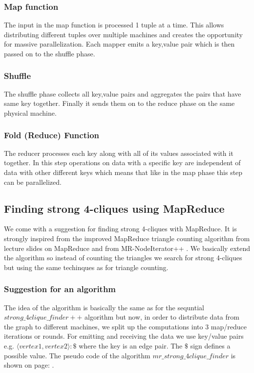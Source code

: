 \documentclass{article}
\begin{document}
\subsubsection{Map function}
The input in the map function is processed 1 tuple at a time. This allows distributing different tuples over multiple machines and creates the opportunity for massive parallelization. Each mapper emits a key,value pair which is then passed on to the shuffle phase.

\subsubsection{Shuffle}
The shuffle phase collects all key,value pairs and aggregates the pairs that have same key together. Finally it sends them on to the reduce phase on the same physical machine.

\subsubsection{Fold (Reduce) Function}
The reducer processes each key along with all of its values associated with it together. In this step operations on data with a specific key are independent of data with other different keys which means that like in the map phase this step can be parallelized.

\subsection{Finding strong 4-cliques using MapReduce}
We come with a suggestion for finding strong 4-cliques with MapReduce. It is strongly inspired from the improved MapReduce triangle counting algorithm from lecture slides on MapReduce \cite{lnMapReduce} and from MR-NodeIterator++ \cite{countingTriangles}. We basically extend the algorithm so instead of counting the triangles we search for strong 4-cliques but using the same techinques as for triangle counting.

\subsubsection{Suggestion for an algorithm}
The idea of the algorithm is basically the same as for the sequntial $strong\_4clique\_finder++$ algorithm but now, in order to distribute data from the graph to different machines, we split up the computations into 3 map/reduce iterations or rounds. For emitting and receiving the data we use key/value pairs e.g. $\langle vertex1,vertex2\rangle :\$$ where the key is an edge pair. The $\$$ sign defines a possible value. The pseudo code of the algorithm $mr\_strong\_4clique\_finder$ is shown on page: \pageref{mrAlgorithm}.
\end{document}
